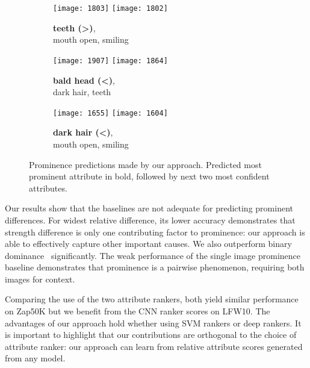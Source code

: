 \documentclass[10pt,twocolumn,letterpaper]{article}
\begin{document}
\begin{figure}[t]
    \begin{subfigure}[c]{0.3\linewidth}
        \centering
        \texttt{[image: 1803]}
        \texttt{[image: 1802]}
        \caption{\textbf{teeth (\textgreater)},\\ mouth open, smiling}
        \label{fig:lfw6}
    \end{subfigure}
    \hfill
    \begin{subfigure}[c]{0.3\linewidth}
        \centering
        \texttt{[image: 1907]}
        \texttt{[image: 1864]}
        \caption{\textbf{bald head (\textless)},\\ dark hair, teeth}
        \label{fig:lfw2}
    \end{subfigure}
    \hfill
    \begin{subfigure}[c]{0.3\linewidth}
        \centering
        \texttt{[image: 1655]}
        \texttt{[image: 1604]}
        \caption{\textbf{dark hair (\textless)},\\ mouth open, smiling}
        \label{fig:lfw3}
    \end{subfigure}
    
    \vspace{0.1cm}
    
    \caption[Sample Prominent Difference Prediction, Strong Results]{Prominence predictions made by our approach. Predicted most prominent attribute in bold, followed by next two most confident attributes.}
    \label{fig:good}
\end{figure}

Our results show that the baselines are not adequate for predicting prominent differences. For widest relative difference, its lower accuracy demonstrates that strength difference is only one contributing factor to prominence: our approach is able to effectively capture other important causes. We also outperform binary dominance~\cite{dominance} significantly. The weak performance of the single image prominence baseline demonstrates that prominence is a pairwise phenomenon, requiring both images for context.

Comparing the use of the two attribute rankers, both yield similar performance on Zap50K but we benefit from the CNN ranker scores on LFW10. The advantages of our approach hold whether using SVM rankers or deep rankers. It is important to highlight that our contributions are orthogonal to the choice of attribute ranker: our approach can learn from relative attribute scores generated from any model.
\end{document}
